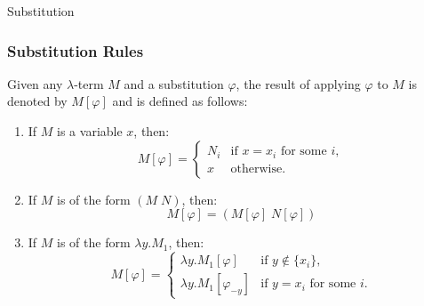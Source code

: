 \documentclass{beamer}
\begin{document}
\begin{frame}{Substitution}
  \frametitle{Substitution Rules}
  
  Given any $\lambda$-term \(M\) and a substitution \(\varphi\), the result of applying \(\varphi\) to \(M\) is denoted by \(M[\varphi]\) and is defined as follows:
  \begin{enumerate}
    \item If \(M\) is a variable \(x\), then:
      \[
      M[\varphi] = 
      \begin{cases} 
        N_i & \text{if } x = x_i \text{ for some } i, \\
        x & \text{otherwise.}
      \end{cases}
      \]
    \item If \(M\) is of the form \((M \; N)\), then:
      \[
      M[\varphi] = (M[\varphi] \; N[\varphi])
      \]
    \item If \(M\) is of the form \(\lambda y.M_1\), then:
      \[
      M[\varphi] = 
      \begin{cases} 
        \lambda y.M_1[\varphi] & \text{if } y \notin \{x_i\}, \\
        \lambda y.M_1[\varphi_{-y}] & \text{if } y = x_i \text{ for some } i.
      \end{cases}
      \]
  \end{enumerate}
\end{frame}
\end{document}
